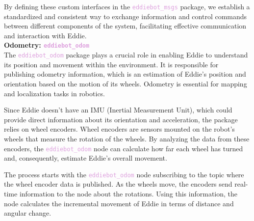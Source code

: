 By defining these custom interfaces in the \textcolor{Plum}{\texttt{eddiebot\_msgs}} package, we establish a standardized and consistent way to exchange information and control commands between different components of the system, facilitating effective communication and interaction with Eddie.\\

\textbf{Odometry: \textcolor{Plum}{\texttt{\Large eddiebot\_odom}}}\\
The \textcolor{Plum}{\texttt{eddiebot\_odom}} package plays a crucial role in enabling Eddie to understand its position and movement within the environment. It is responsible for publishing odometry information, which is an estimation of Eddie's position and orientation based on the motion of its wheels. Odometry is essential for mapping and localization tasks in robotics.

Since Eddie doesn't have an IMU (Inertial Measurement Unit), which could provide direct information about its orientation and acceleration, the package relies on wheel encoders. Wheel encoders are sensors mounted on the robot's wheels that measure the rotation of the wheels. By analyzing the data from these encoders, the \textcolor{Plum}{\texttt{eddiebot\_odom}} node can calculate how far each wheel has turned and, consequently, estimate Eddie's overall movement.

The process starts with the \textcolor{Plum}{\texttt{eddiebot\_odom}} node subscribing to the topic where the wheel encoder data is published. As the wheels move, the encoders send real-time information to the node about the rotations. Using this information, the node calculates the incremental movement of Eddie in terms of distance and angular change. 


